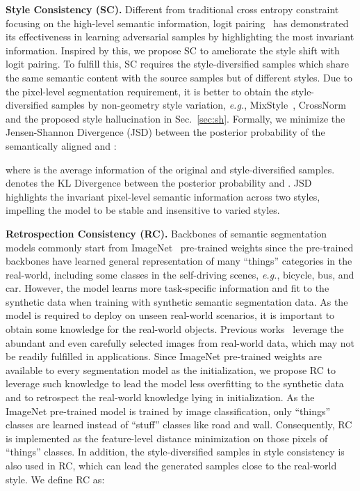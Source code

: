 \documentclass[runningheads]{llncs}
\def\eg{\emph{e.g.}} \def\Eg{\emph{E.g.}}
\begin{document}
\noindent\textbf{Style Consistency (SC).}
Different from traditional cross entropy constraint focusing on the high-level semantic information, logit pairing~\cite{hendrycks2020augmix,kannan2018adversarial} has demonstrated its effectiveness in learning adversarial samples by highlighting the most invariant information.
Inspired by this, we propose SC to ameliorate the style shift with logit pairing.
To fulfill this, SC requires the style-diversified samples  which share the same semantic content with the source samples  but of different styles. Due to the pixel-level segmentation requirement, it is better to obtain the style-diversified samples  by non-geometry style variation, \eg, MixStyle~\cite{zhou2021mixstyle}, CrossNorm~\cite{crossnorm} and the proposed style hallucination in Sec.~\ref{sec:sh}.
Formally, we minimize the Jensen-Shannon Divergence (JSD) between the posterior probability  of the semantically aligned  and :

where  is the average information of the original and style-diversified samples.  denotes the KL Divergence between the posterior probability  and . 
JSD highlights the invariant pixel-level semantic information across two styles, impelling the model to be stable and insensitive to varied styles.

\noindent\textbf{Retrospection Consistency (RC).}
Backbones of semantic segmentation models commonly start from ImageNet~\cite{imagenet} pre-trained weights since the pre-trained backbones have learned general representation of many ``things'' categories in the real-world, including some classes in the self-driving scenes, \eg, bicycle, bus, and car. However, the model learns more task-specific information and fit to the synthetic data when training with synthetic semantic segmentation data.
As the model is required to deploy on unseen real-world scenarios, it is important to obtain some knowledge for the real-world objects.
Previous works~\cite{DRPC,FSDR} leverage the abundant and even carefully selected images from real-world data, which may not be readily fulfilled in applications. 
Since ImageNet pre-trained weights are available to every segmentation model as the initialization, we propose RC to leverage such knowledge to lead the model less overfitting to the synthetic data and to retrospect the real-world knowledge lying in initialization.
As the ImageNet pre-trained model is trained by image classification, only ``things'' classes are learned instead of ``stuff'' classes like road and wall. Consequently, RC is implemented as the feature-level distance minimization on those pixels of ``things'' classes.
In addition, the style-diversified samples  in style consistency is also used in RC, which can lead the generated samples close to the real-world style.
We define RC as:
\end{document}
